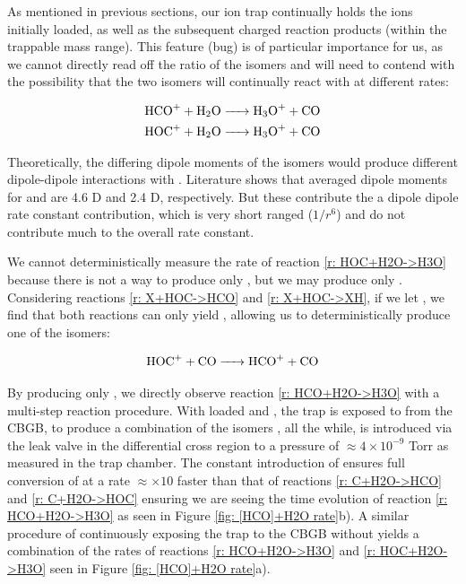 As mentioned in previous sections, our ion trap continually holds the ions initially loaded, as well as the subsequent charged reaction products (within the trappable mass range). This feature (bug) is of particular importance for us, as we cannot directly read off the ratio of the isomers and will need to contend with the possibility that the two isomers will continually react with  at different rates:

\begin{align}
	\ce{HCO+ + H2O & -> H3O+ + CO} \label{r: HCO+H2O->H3O} \\
	\ce{HOC+ + H2O & -> H3O+ + CO} \label{r: HOC+H2O->H3O}
\end{align}

Theoretically, the differing dipole moments of the isomers would produce different dipole-dipole interactions with . Literature shows that averaged dipole moments for  and  are 4.6 D and 2.4 D, respectively.\cite{Rogers1982} But these contribute the a dipole dipole rate constant contribution, which is very short ranged ($1/r^6$) and do not contribute much to the overall rate constant.

We cannot deterministically measure the rate of reaction \ref{r: HOC+H2O->H3O} because there is not a way to produce only , but we may produce only . Considering reactions \ref{r: X+HOC->HCO} and \ref{r: X+HOC->XH}, if we let , we find that both reactions can only yield , allowing us to deterministically produce one of the isomers:

\begin{equation}
\ce{HOC+ + CO -> HCO+ + CO} \label{r: HOC+CO->HCO}
\end{equation}

By producing only , we directly observe reaction \ref{r: HCO+H2O->H3O} with a multi-step reaction procedure. With loaded  and , the trap is exposed to  from the CBGB, to produce a combination of the isomers \ce{[HCO]+}, all the while,  is introduced via the leak valve in the differential cross region to a pressure of $\approx 4 \times 10^{-9}$ Torr as measured in the trap chamber. The constant introduction of  ensures full conversion of  at a rate $\approx \times 10$ faster than that of reactions \ref{r: C+H2O->HCO} and \ref{r: C+H2O->HOC} ensuring we are seeing the time evolution of reaction \ref{r: HCO+H2O->H3O} as seen in Figure \ref{fig: [HCO]+H2O rate}b). A similar procedure of continuously exposing the trap to the CBGB without  yields a combination of the rates of reactions \ref{r: HCO+H2O->H3O} and \ref{r: HOC+H2O->H3O} seen in Figure \ref{fig: [HCO]+H2O rate}a).


